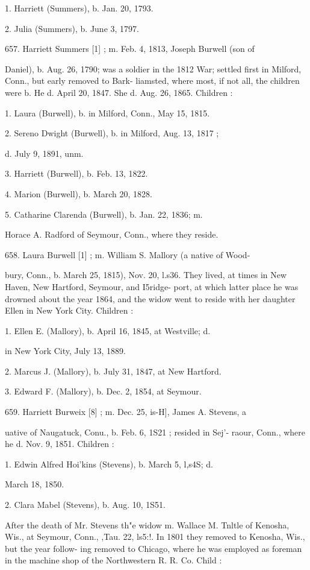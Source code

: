1. Harriett (Summers), b. Jan. 20, 1793. 

2. Julia (Summers), b. June 3, 1797. 

657. Harriett Summers [1] ; m. Feb. 4, 1813, Joseph Burwell (son of 

Daniel), b. Aug. 26, 1790; was a soldier in the 1812 War; 
settled first in Milford, Conn., but early removed to Bark- 
liamsted, where most, if not all, the children were b. He d. 
April 20, 1847. She d. Aug. 26, 1865. Children : 

1. Laura (Burwell), b. in Milford, Conn., May 15, 1815. 

2. Sereno Dwight (Burwell), b. in Milford, Aug. 13, 1817 ; 

d. July 9, 1891, unm. 

3. Harriett (Burwell), b. Feb. 13, 1822. 

4. Marion (Burwell), b. March 20, 1828. 

5. Catharine Clarenda (Burwell), b. Jan. 22, 1836; m. 

Horace A. Radford of Seymour, Conn., where they 
reside. 

658. Laura Burwell [1] ; m. William S. Mallory (a native of Wood- 

bury, Conn., b. March 25, 1815), Nov. 20, l.s36. They lived, 
at times in New Haven, New Hartford, Seymour, and I5ridge- 
port, at which latter place he was drowned about the year 
1864, and the widow went to reside with her daughter Ellen 
in New York City. Children : 

1. Ellen E. (Mallory), b. April 16, 1845, at Westville; d. 

in New York City, July 13, 1889. 

2. Marcus J. (Mallory), b. July 31, 1847, at New Hartford. 

3. Edward F. (Mallory), b. Dec. 2, 1854, at Seymour. 




659. Harriett Burweix [8] ; m. Dec. 25, is-H], James A. Stevens, a 

uative of Naugatuck, Conu., b. Feb. 6, 1S21 ; resided in Sej'- 
raour, Conn., where he d. Nov. 9, 1851. Children : 

1. Edwin Alfred Hoi'kins (Stevens), b. March 5, l,s4S; d. 

March 18, 1850. 

2. Clara Mabel (Stevens), b. Aug. 10, 1S51. 

After the death of Mr. Stevens th"e widow m. Wallace M. 
Tnltle of Kenosha, Wis., at Seymour, Conn., ,Tau. 22, ls5:!. 
In 1801 they removed to Kenosha, Wis., but the year follow- 
ing removed to Chicago, where he was employed as foreman 
in the machine shop of the Northwestern R. R. Co. Child : 

